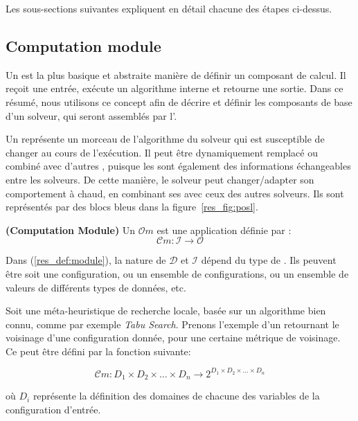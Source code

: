 Les sous-sections suivantes expliquent en détail chacune des étapes ci-dessus.

\subsection{Computation module}

Un \infr{\om{}}  est la plus basique  et abstraite manière de définir un composant de calcul. Il reçoit une entrée, exécute un algorithme interne et retourne une sortie. Dans ce résumé, nous utilisons ce concept afin de décrire et définir les composants de base d'un  solveur, qui seront assemblés par l'\infr{\as}.  

Un \om{} représente un  morceau de l'algorithme du solveur  qui est susceptible de changer au cours de  l'exécution. Il peut être dynamiquement remplacé  ou combiné avec d'autres \infr{\oms}, puisque les \infr{\oms{}} sont également des informations échangeables  entre  les solveurs. De cette manière, le solveur  peut changer/adapter son comportement à chaud, en combinant  ses \infr{\oms{}} avec ceux  des autres solveurs. Ils sont  représentés par  des blocs  bleus dans  la figure~\ref{res_fig:posl}.

\begin{lemma}\label{res_def:module} \textbf{(Computation Module)}
Un \om{} $\mathcal{O}m$ est une application définie par :
\begin{equation}
 \mathcal{C}m:\mathcal{I} \rightarrow \mathcal{O}
\end{equation}
\end{lemma}

Dans (\ref{res_def:module}),  la nature de $\mathcal{D}$  et $\mathcal{I}$ dépend du type de \infr{\om{}}. Ils peuvent être soit une configuration, ou un  ensemble de configurations, ou un ensemble de valeurs de différents types de données, etc.

Soit une méta-heuristique de recherche locale, basée sur un algorithme bien connu, comme par exemple {\it Tabu Search}. Prenons l'exemple d'un  \infr{\om{}} retournant le voisinage d'une configuration donnée, pour une certaine métrique de voisinage. Ce \infr{\om{}} peut être défini par la fonction suivante:

\begin{equation}
\mathcal{C}m:D_1\times D_2\times\dots\times D_n \rightarrow 2^{D_1\times D_2\times\dots\times D_n}
\end{equation}

où $D_i$  représente  la  définition  des  domaines  de  chacune  des variables de la configuration d'entrée.

